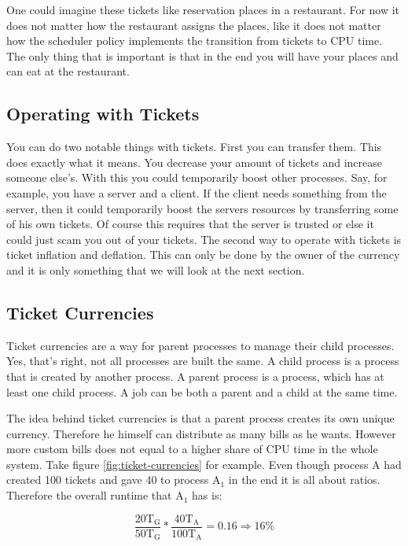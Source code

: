 One could imagine these tickets like reservation places in a restaurant. For now it does not matter how the restaurant assigns the places, like it does not matter how the scheduler policy implements the transition from tickets to CPU time. The only thing that is important is that in the end you will have your places and can eat at the restaurant.


\subsection{Operating with Tickets}

You can do two notable things with tickets. First you can transfer them. 
This does exactly what it means. You decrease your amount of tickets and increase someone else's. 
With this you could temporarily boost other processes.
Say, for example, you have a server and a client.
If the client needs something from the server, then it could temporarily boost the servers resources by transferring some of his own tickets.
Of course this requires that the server is trusted or else it could just scam you out of your tickets.
The second way to operate with tickets is ticket inflation and deflation. This can only be done by the owner of the currency and it is only something that we will look at the next section.

\subsection{Ticket Currencies}

Ticket currencies are a way for parent processes to manage their child processes.
Yes, that's right, not all processes are built the same.
A child process is a process that is created by another process.
A parent process is a process, which has at least one child process.
A job can be both a parent and a child at the same time.

The idea behind ticket currencies is that a parent process creates its own unique currency. Therefore he himself can distribute as many bills as he wants. 
However more custom bills does not equal to a higher share of CPU time in the whole system.
Take figure \ref{fig:ticket-currencies} for example. Even though process A had created 100 tickets and gave 40 to process A$_1$ in the end it is all about ratios.
Therefore the overall runtime that A$_1$ has is: 

$$\frac{20\text{T}_\text{G}}{50\text{T}_\text{G}} * \frac{40\text{T}_\text{A}}{100\text{T}_\text{A}} = 0.16 \Rightarrow 16\%$$

